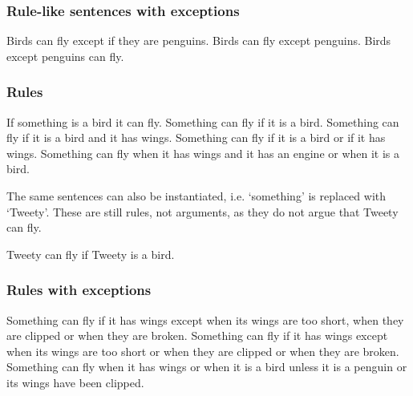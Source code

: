 \subsubsection{Rule-like sentences with exceptions}
\begin{exe}
\ex\label{e56} Birds can fly except if they are penguins.
\ex\label{e57} Birds can fly except penguins.
\ex\label{e58} Birds except penguins can fly.
\end{exe}

\subsubsection{Rules}
\begin{exe}
\ex\label{e72} If something is a bird it can fly.
\ex\label{e73} Something can fly if it is a bird.
\ex\label{e74} Something can fly if it is a bird and it has wings.
\ex\label{e75} Something can fly if it is a bird or if it has wings.
\ex\label{e76} Something can fly when it has wings and it has an engine or when it is a bird.
\end{exe}

\noindent The same sentences can also be instantiated, i.e. `something' is replaced with `Tweety'. These are still rules, not arguments, as they do not argue that Tweety can fly.
\begin{exe}
\ex\label{e77} Tweety can fly if Tweety is a bird.
\end{exe}

\subsubsection{Rules with exceptions}
\begin{exe}
\ex\label{e80} Something can fly if it has wings except when its wings are too short, when they are clipped or when they are broken.
\ex\label{e81} Something can fly if it has wings except when its wings are too short or when they are clipped or when they are broken.
\ex\label{e82} Something can fly when it has wings or when it is a bird unless it is a penguin or its wings have been clipped. 
\end{exe}

